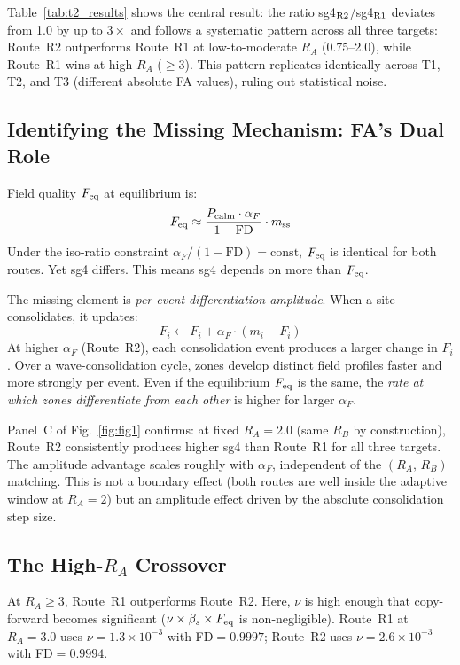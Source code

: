 \documentclass[11pt]{article}
\begin{document}
Table~\ref{tab:t2_results} shows the central result: the ratio sg4$_{\rm R2}$/sg4$_{\rm R1}$
deviates from 1.0 by up to $3\times$ and follows a systematic pattern across
all three targets: Route~R2 outperforms Route~R1 at low-to-moderate $R_A$
(0.75--2.0), while Route~R1 wins at high $R_A$ ($\geq 3$). This pattern
replicates identically across T1, T2, and T3 (different absolute FA values),
ruling out statistical noise.

\subsection{Identifying the Missing Mechanism: FA's Dual Role}

Field quality $F_{\rm eq}$ at equilibrium is:
\[
F_{\rm eq} \approx \frac{P_{\rm calm} \cdot \alpha_F}{1 - \text{FD}} \cdot m_{\rm ss}
\]
Under the iso-ratio constraint $\alpha_F / (1-\text{FD}) = \text{const}$, $F_{\rm eq}$ is
identical for both routes. Yet sg4 differs. This means sg4 depends on more
than $F_{\rm eq}$.

The missing element is \emph{per-event differentiation amplitude}. When a site
consolidates, it updates:
\[
F_i \leftarrow F_i + \alpha_F \cdot (m_i - F_i)
\]
At higher $\alpha_F$ (Route~R2), each consolidation event produces a larger
change in $F_i$. Over a wave-consolidation cycle, zones develop distinct
field profiles faster and more strongly per event. Even if the equilibrium
$F_{\rm eq}$ is the same, the \emph{rate at which zones differentiate from
each other} is higher for larger $\alpha_F$.

Panel~C of Fig.~\ref{fig:fig1} confirms: at fixed $R_A = 2.0$ (same $R_B$ by
construction), Route~R2 consistently produces higher sg4 than Route~R1 for all
three targets. The amplitude advantage scales roughly with $\alpha_F$,
independent of the $(R_A,\,R_B)$ matching. This is not a boundary effect
(both routes are well inside the adaptive window at $R_A=2$) but an
amplitude effect driven by the absolute consolidation step size.

\subsection{The High-$R_A$ Crossover}

At $R_A \geq 3$, Route~R1 outperforms Route~R2. Here, $\nu$ is high enough
that copy-forward becomes significant ($\nu \times \beta_s \times F_{\rm eq}$
is non-negligible). Route~R1 at $R_A=3.0$ uses $\nu = 1.3\times10^{-3}$ with
FD$=0.9997$; Route~R2 uses $\nu = 2.6\times10^{-3}$ with FD$=0.9994$.
\end{document}
